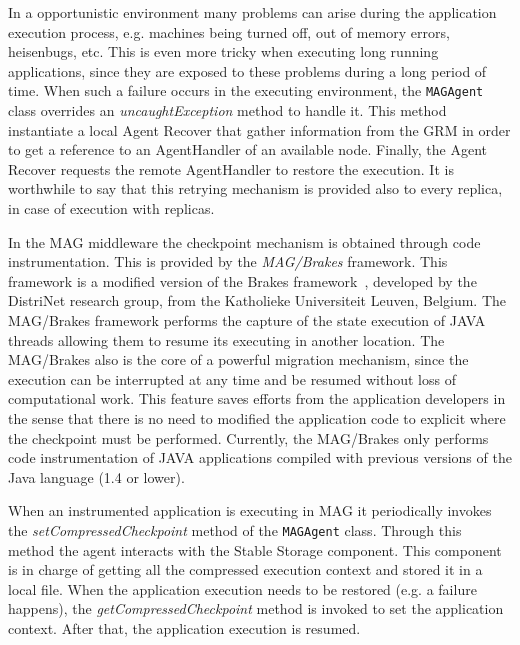 \documentclass[times, 10pt, twocolumn]{article}
\begin{document}
\begin{enumerate}
In a opportunistic environment many problems can arise during the application
execution process, e.g. machines being turned off, out of memory errors,
heisenbugs, etc. This is even more tricky when executing long running
applications, since they are exposed to these problems during a long period of
time. When such a failure occurs in the executing environment, the {\tt MAGAgent}
class overrides an \emph{uncaughtException} method to handle it. This method
instantiate a local Agent Recover that gather information from the GRM in order
to get a reference to an AgentHandler of an available node. Finally, the
Agent Recover requests the remote AgentHandler to restore the execution. It is
worthwhile to say that this retrying mechanism is provided also to every
replica, in case of execution with replicas.

In the MAG middleware the checkpoint mechanism is obtained through code
instrumentation. This is provided by the \emph{MAG/Brakes} framework. This
framework is a modified version of the Brakes framework~\cite{brakes00}, developed by the
DistriNet research group, from the Katholieke Universiteit Leuven, Belgium. The
MAG/Brakes framework performs the capture of the state execution of JAVA
threads allowing them to resume its executing in another location. The MAG/Brakes also is the
core of a powerful migration mechanism, since the execution can be interrupted at any time
and be resumed without loss of computational work. This feature saves efforts from the
application developers in the sense that there is no need to modified the application
code to explicit where the checkpoint must be performed. Currently, the MAG/Brakes
only performs code instrumentation of JAVA applications compiled with previous
versions of the Java language (1.4 or lower).

When an instrumented application is executing in MAG it periodically invokes
the \emph{setCompressedCheckpoint} method of the {\tt MAGAgent} class. Through this method
the agent interacts with the Stable Storage component. This component is in
charge of getting all the compressed execution context and stored it in a local
file. When the application execution needs to be restored (e.g. a failure happens), the
\emph{getCompressedCheckpoint} method is invoked to set the application
context. After that, the application execution is resumed.


\end{enumerate}
\end{document}
